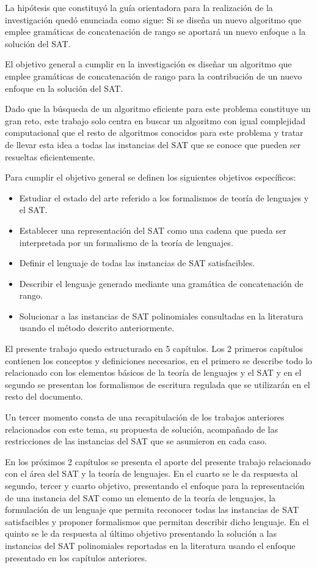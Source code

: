 La hipótesis que constituyó la guía orientadora para la realización de la investigación quedó enunciada como sigue: Si se diseña un nuevo algoritmo que emplee gramáticas de concatenación de rango se aportará un nuevo enfoque a la solución del
SAT.

El objetivo general a cumplir en la investigación es diseñar un algoritmo que emplee gramáticas de concatenación de rango para la contribución
de un nuevo enfoque en la solución del SAT.

Dado que la búsqueda
de un algoritmo eficiente para este problema constituye un gran reto, este trabajo solo centra en buscar un algoritmo con igual
complejidad computacional que el resto de algoritmos conocidos para este problema y tratar de llevar esta idea a todas las instancias
del SAT que se conoce que pueden ser resueltas eficientemente.

Para cumplir el objetivo general se definen los siguientes objetivos específicos:

\begin{itemize}
      \item Estudiar el estado del arte referido a los formalismos de teoría de lenguajes y el SAT.
      \item Establecer una representación del SAT como una cadena que pueda ser interpretada por un formalismo de la teoría de lenguajes.
      \item Definir el lenguaje de todas las instancias de SAT satisfacibles.
      \item Describir el lenguaje generado mediante una gramática de concatenación de rango.
      \item Solucionar a las instancias de SAT polinomiales consultadas en la literatura usando el método descrito anteriormente.
\end{itemize}

El presente trabajo quedo estructurado en 5 capítulos. Los 2 primeros capítulos contienen los conceptos y definiciones
necesarios, en el primero se describe todo lo relacionado con los elementos básicos
de la teoría de lenguajes y el SAT y en el segundo se presentan los formalismos de escritura regulada que se utilizarán en el resto
del documento.

Un tercer momento consta de una recapitulación de los trabajos anteriores relacionados con este tema, su propuesta
de solución, acompañado de las restricciones de las instancias del SAT que se asumieron en cada caso.

En los próximos 2 capítulos se presenta el aporte del presente trabajo relacionado con el área del SAT y la teoría de lenguajes.
En el cuarto se le da respuesta al segundo, tercer y cuarto objetivo, presentando el enfoque para la representación de una instancia
del SAT como un elemento de la teoría de lenguajes, la formulación de un lenguaje que permita reconocer todas las instancias
de SAT satisfacibles y proponer formalismos que permitan describir dicho lenguaje.
En el quinto se le da respuesta al último objetivo presentando la solución a las instancias del SAT polinomiales reportadas en la literatura
usando el enfoque presentado en los capítulos anteriores.

